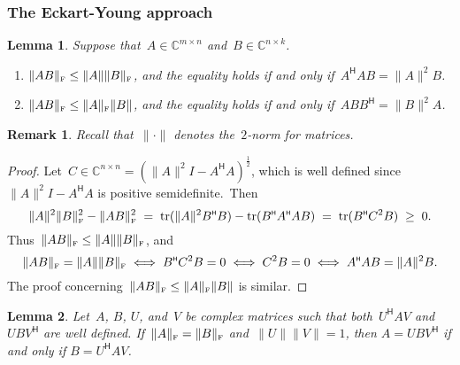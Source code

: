 \documentclass[11pt,a4paper]{article}  %
\numberwithin{equation}{section}
\newtheorem{lemma}{Lemma}%
\newtheorem{remark}{Remark}%
\theoremstyle{definition}
\def\CC{\mathbb{C}}
\DeclareMathOperator{\tr}{tr}
\newcommand{\fro}{{\scriptscriptstyle{\textnormal{F}}}}
\newcommand{\hmt}{{\scriptscriptstyle{{\mathsf{H}}}}}
\begin{document}
\subsubsection{The Eckart-Young approach~\cite{Eckart_Young_1939}}

\begin{lemma}
  \label{lem:fro2}
  Suppose that~$A \in \CC^{m\times n}$ and~$B \in \CC^{n\times k}$.
  \begin{enumerate}[leftmargin=1.5em]
    \item $\|AB\|_\fro \le \|A\| \|B\|_\fro$, and the equality holds if and only if~$A^\hmt A B = \|A\|^2 B$.
    \item $\|AB\|_\fro \le \|A\|_\fro\|B\|$, and the equality holds if and only if~$ABB^\hmt = \|B\|^2 A$.
  \end{enumerate}
\end{lemma}

\begin{remark}
  Recall that~$\|\cdot\|$ denotes the~$2$-norm for matrices.
\end{remark}

\begin{proof}
  Let~$C\in\CC^{n\times n}=(\|A\|^2 I - A^\hmt A)^\frac{1}{2}$, which is well defined since~$\|A\|^2
  I - A^\hmt A$ is positive semidefinite.~Then%
  \begin{equation*}
  \|A\|^2\|B\|_\fro^2 - \|AB\|_\fro^2 \;=\; \tr(\|A\|^2 B^\hmt B) - \tr(B^\hmt A^\hmt A B)\;=\; \tr(B^\hmt C^2 B)\;\ge\; 0.
  \end{equation*}
  Thus~$\|AB\|_\fro \le \|A\|\|B\|_\fro$, and
  \begin{equation*}
    \|AB\|_\fro = \|A\|\|B\|_\fro
    \;\Longleftrightarrow \; B^\hmt C^2 B =0
    \;\Longleftrightarrow \; C^2 B =0
    \;\Longleftrightarrow \; A^\hmt A B = \|A\|^2 B.
  \end{equation*}
  The proof concerning~$\|AB\|_\fro \le \|A\|_\fro\|B\|$ is similar.
\end{proof}

\begin{lemma}
  \label{lem:uav}
  Let~$A$, $B$, $U$, and~$V$ be complex matrices such that both~$U^\hmt AV$
  and~$UBV^\hmt$ are well defined.
  If~$\|A\|_\fro=\|B\|_\fro$ and~$\|U\|\|V\|=1$, then $A = UBV^\hmt$ if and only if
  $B = U^\hmt A V$.
\end{lemma}
\end{document}
